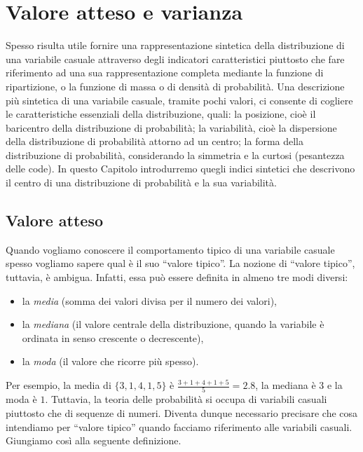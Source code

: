 \documentclass[
  11pt,
]{krantz}
\providecommand{\tightlist}{%
  \setlength{\itemsep}{0pt}\setlength{\parskip}{0pt}}
\theoremstyle{definition}
\theoremstyle{definition}
\theoremstyle{definition}
\theoremstyle{definition}
\theoremstyle{remark}
\begin{document}
\hypertarget{exp-val-and-variance-rv}{%
\chapter{Valore atteso e varianza}\label{exp-val-and-variance-rv}}

Spesso risulta utile fornire una rappresentazione sintetica della distribuzione di una variabile casuale attraverso degli indicatori caratteristici piuttosto che fare riferimento ad una sua rappresentazione completa mediante la funzione di ripartizione, o la funzione di massa o di densità di probabilità. Una descrizione più sintetica di una variabile casuale, tramite pochi valori, ci consente di cogliere le caratteristiche essenziali della distribuzione, quali: la posizione, cioè il baricentro della distribuzione di probabilità; la variabilità, cioè la dispersione della distribuzione di probabilità attorno ad un centro; la forma della distribuzione di probabilità, considerando la simmetria e la curtosi (pesantezza delle code). In questo Capitolo introdurremo quegli indici sintetici che descrivono il centro di una distribuzione di probabilità e la sua variabilità.

\hypertarget{valore-atteso}{%
\section{Valore atteso}\label{valore-atteso}}

Quando vogliamo conoscere il comportamento tipico di una variabile casuale spesso vogliamo sapere qual è il suo ``valore tipico''. La nozione di ``valore tipico'', tuttavia, è ambigua. Infatti, essa può essere definita in almeno tre modi diversi:

\begin{itemize}
\tightlist
\item
  la \emph{media} (somma dei valori divisa per il numero dei valori),
\item
  la \emph{mediana} (il valore centrale della distribuzione, quando la variabile è ordinata in senso crescente o decrescente),
\item
  la \emph{moda} (il valore che ricorre più spesso).
\end{itemize}

Per esempio, la media di \(\{3, 1, 4, 1, 5\}\) è \(\frac{3+1+4+1+5}{5} = 2.8\), la mediana è \(3\) e la moda è \(1\). Tuttavia, la teoria delle probabilità si occupa di variabili casuali piuttosto che di sequenze di numeri. Diventa dunque necessario precisare che cosa intendiamo per ``valore tipico'' quando facciamo riferimento alle variabili casuali. Giungiamo così alla seguente definizione.
\end{document}
